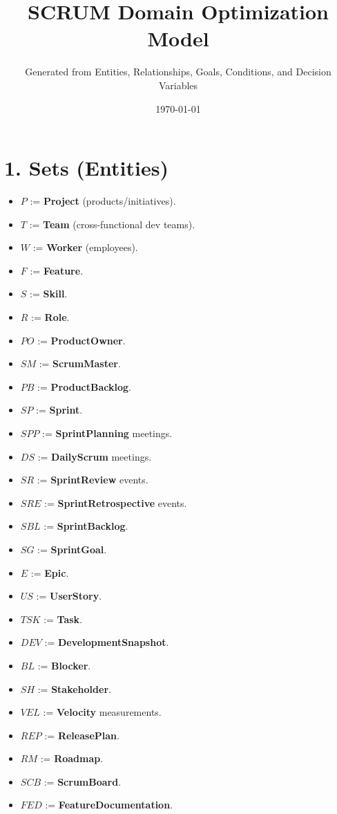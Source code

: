 \documentclass[11pt,a4paper]{article}
\title{SCRUM Domain Optimization Model}
\author{Generated from Entities, Relationships, Goals, Conditions, and Decision Variables}
\date{\today}
\begin{document}
\maketitle
\tableofcontents
\newpage

\section{1. Sets (Entities)}
\begin{itemize}[leftmargin=2.2em]
  \item $P$ := \textbf{Project} (products/initiatives).
  \item $T$ := \textbf{Team} (cross-functional dev teams).
  \item $W$ := \textbf{Worker} (employees).
  \item $F$ := \textbf{Feature}.
  \item $S$ := \textbf{Skill}.
  \item $R$ := \textbf{Role}.
  \item $PO$ := \textbf{ProductOwner}.
  \item $SM$ := \textbf{ScrumMaster}.
  \item $PB$ := \textbf{ProductBacklog}.
  \item $SP$ := \textbf{Sprint}.
  \item $SPP$ := \textbf{SprintPlanning} meetings.
  \item $DS$ := \textbf{DailyScrum} meetings.
  \item $SR$ := \textbf{SprintReview} events.
  \item $SRE$ := \textbf{SprintRetrospective} events.
  \item $SBL$ := \textbf{SprintBacklog}.
  \item $SG$ := \textbf{SprintGoal}.
  \item $E$ := \textbf{Epic}.
  \item $US$ := \textbf{UserStory}.
  \item $TSK$ := \textbf{Task}.
  \item $DEV$ := \textbf{DevelopmentSnapshot}.
  \item $BL$ := \textbf{Blocker}.
  \item $SH$ := \textbf{Stakeholder}.
  \item $VEL$ := \textbf{Velocity} measurements.
  \item $REP$ := \textbf{ReleasePlan}.
  \item $RM$ := \textbf{Roadmap}.
  \item $SCB$ := \textbf{ScrumBoard}.
  \item $FED$ := \textbf{FeatureDocumentation}.
\end{itemize}
\end{document}
